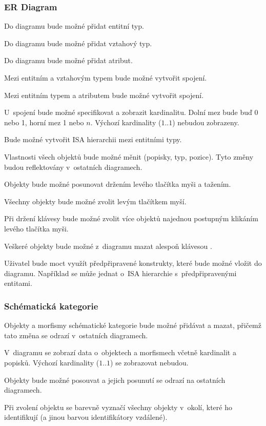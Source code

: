 \subsubsection*{ER Diagram}
\begin{enumfp}[resume]
  \item Do diagramu bude možné přidat entitní typ.
  \item Do diagramu bude možné přidat vztahový typ.
  \item Do diagramu bude možné přidat atribut.
  \item Mezi entitním a vztahovým typem bude možné vytvořit spojení.
  \item Mezi entitním typem a atributem bude možné vytvořit spojení.
  \item U~spojení bude možné specifikovat a zobrazit kardinalitu.
  Dolní mez bude buď 0 nebo 1, horní mez 1 nebo $n$.
  Výchozí kardinality ($1..1$) nebudou zobrazeny.
  \item Bude možné vytvořit ISA hierarchii mezi entitními typy.
  \item Vlastnosti všech objektů bude možné měnit (popisky, typ, pozice).
  Tyto změny budou reflektovány v~ostatních diagramech.
  \item Objekty bude možné posunovat držením levého tlačítka myši a tažením.
  \item Všechny objekty bude možné zvolit levým tlačítkem myší.
  \item Při držení klávesy \keys{\ctrl} bude možné zvolit více objektů najednou postupným klikáním levého tlačítka myši.
  \item Veškeré objekty bude možné z~diagramu mazat alespoň klávesou .
  \item Uživatel bude moct využít předpřipravené konstrukty, které bude možné vložit do diagramu.
  Například se může jednat o~ISA hierarchie s~předpřipravenými entitami.
\end{enumfp}

\subsubsection*{Schématická kategorie}
\begin{enumfp}[resume]
  \item Objekty a morfismy schématické kategorie bude možné přidávat a mazat, přičemž tato změna se odrazí v~ostatních diagramech.
  \item V~diagramu se zobrazí data o~objektech a morfismech včetně kardinalit a popisků.
  Výchozí kardinality ($1..1$) se zobrazovat nebudou.
  \item Objekty bude možné posouvat a jejich posunutí se odrazí na ostatních diagramech.
  \item Při zvolení objektu se barevně vyznačí všechny objekty v~okolí, které ho identifikují (a jinou barvou identifikátory vzdálené).
\end{enumfp}

